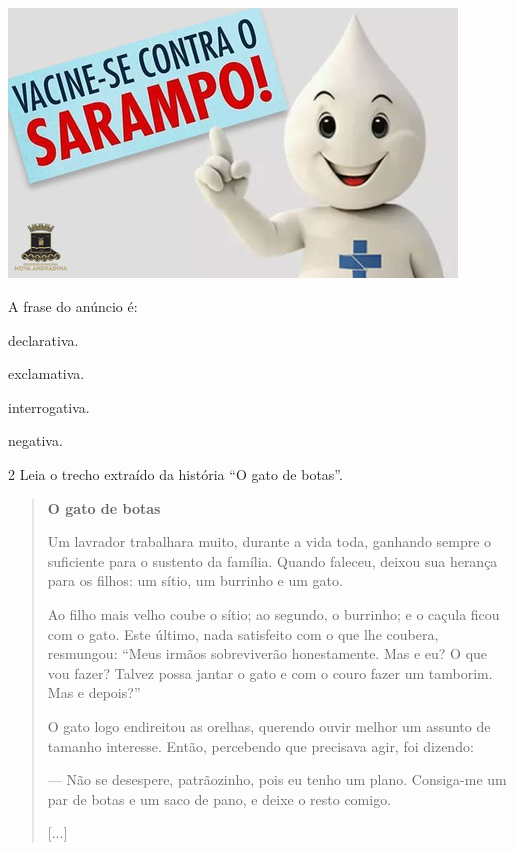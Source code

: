 \includegraphics[width=4.68681in,height=2.81736in]{./media/image7.jpeg}

A frase do anúncio é:

\begin{escolha}
\item
  declarativa.
\item
  exclamativa.
\item
  interrogativa.
\item
  negativa.
\end{escolha}

\num{2} Leia o trecho extraído da história ``O gato de botas''.

\begin{quote}
\textbf{O gato de botas}

Um lavrador trabalhara muito, durante a vida toda, ganhando sempre o
suficiente para o sustento da família. Quando faleceu, deixou sua
herança para os filhos: um sítio, um burrinho e um gato.

Ao filho mais velho coube o sítio; ao segundo, o burrinho; e o caçula
ficou com o gato. Este último, nada satisfeito com o que lhe coubera,
resmungou: ``Meus irmãos sobreviverão honestamente. Mas e eu? O que vou
fazer? Talvez possa jantar o gato e com o couro fazer um tamborim. Mas e
depois?''

O gato logo endireitou as orelhas, querendo ouvir melhor um assunto de
tamanho interesse. Então, percebendo que precisava agir, foi dizendo:

--- Não se desespere, patrãozinho, pois eu tenho um plano. Consiga-me um
par de botas e um saco de pano, e deixe o resto comigo.

{[}...{]}

\end{quote}

